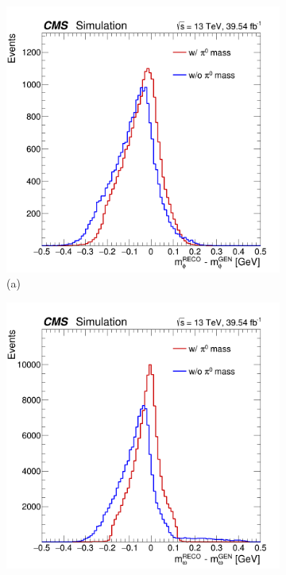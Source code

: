 \begin{figure}[!ht]
    \captionsetup[subfigure]{labelformat=empty}
    \vspace*{-0.2cm}
    \centering
    \setlength{\mylength}{\textwidth}
    \begin{subfigure}[t]{0.50\mylength}
            \centering
            \includegraphics[width=0.49\mylength]{resources/plots/Phi3_fullmeson_mass_residual.png}
            \vspace*{-0.2cm}
            \caption{\footnotesize (a)}
    \end{subfigure}%
    \begin{subfigure}[t]{0.50\mylength}
            \centering
            \includegraphics[width=0.49\mylength]{resources/plots/Omega_fullmeson_mass_residual.png}

\end{subfigure}
\end{figure}
